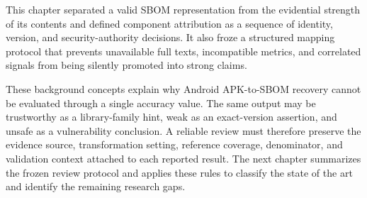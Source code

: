 This chapter separated a valid SBOM representation from the evidential
strength of its contents and defined component attribution as a sequence of
identity, version, and security-authority decisions. It also froze a
structured mapping protocol that prevents unavailable full texts,
incompatible metrics, and correlated signals from being silently promoted
into strong claims.

These background concepts explain why Android APK-to-SBOM recovery cannot be
evaluated through a single accuracy value. The same output may be trustworthy
as a library-family hint, weak as an exact-version assertion, and unsafe as a
vulnerability conclusion. A reliable review must therefore preserve the
evidence source, transformation setting, reference coverage, denominator, and
validation context attached to each reported result. The next chapter
summarizes the frozen review protocol and applies these rules to classify the
state of the art and identify the remaining research gaps.
